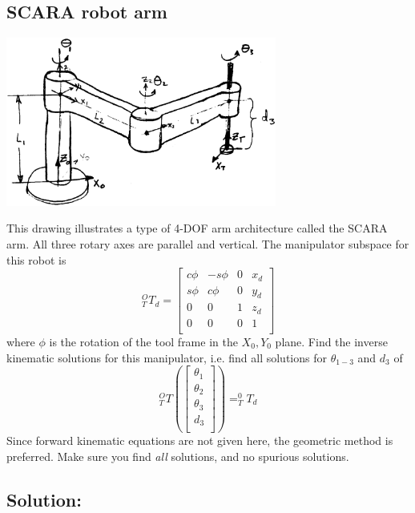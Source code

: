 \begin{Example}

\subsection*{SCARA robot arm}

  \includegraphics[width=3.5in]{figs04/00253.eps}


This drawing illustrates a type of 4-DOF arm architecture called the  SCARA arm.  All three rotary
axes are parallel and vertical. The manipulator subspace for this robot is
\[
^O_TT_d =
        \left [
        \begin{array}{cccc}
        c\phi   & -s\phi        & 0     &       x_d \\
        s\phi   & c\phi         & 0     & y_d   \\
        0       & 0             & 1     & z_d \\
        0       & 0             & 0     & 1 \\
        \end{array}
        \right ]
\]
where $\phi$ is the rotation of the tool frame in the $X_0, Y_0$ plane. Find the inverse kinematic
solutions for this manipulator, i.e.  find all solutions for $\theta_{1-3}$ and $d_3$ of
\[
^O_TT \left(\left[
        \begin{array}{c}
        \theta_1 \\
        \theta_2 \\
        \theta_3 \\
        d_3\\
        \end{array}
        \right ]
        \right )
   =
^0_TT_d
\]
Since forward kinematic equations are not
given here, the geometric method is preferred.  Make sure you find {\it all} solutions, and
no spurious solutions.

\subsection*{Solution:}


\end{Example}
